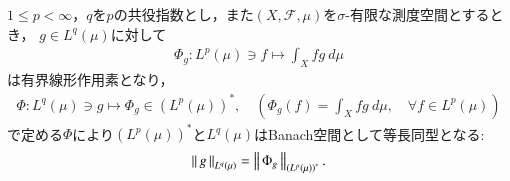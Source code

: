 	\begin{screen}
		\begin{thm}[$L^p$の共役空間]\label{thm:dual_space_of_L_p}
			$1 \leq p < \infty$，$q$を$p$の共役指数とし，また$(X,\mathscr{F},\mu)$を$\sigma$-有限な測度空間とするとき，
			$g \in L^q(\mu)$に対して
			\begin{align}
				\Phi_g: L^p(\mu) \ni f \longmapsto \int_X fg\ d\mu
				\label{eq:thm_dual_space_of_L_p_1}
			\end{align}
			は有界線形作用素となり，
			\begin{align}
				\Phi: L^q(\mu) \ni g \longmapsto \Phi_g \in \left( L^p(\mu) \right)^*,
				\quad \left( \Phi_g(f) = \int_X fg\ d\mu,\quad \forall f \in L^p(\mu) \right)
			\end{align}
			で定める$\Phi$により$\left( L^p(\mu) \right)^*$と$L^q(\mu)$はBanach空間として等長同型となる:
			\begin{align}
				\left\|\, g\, \right\|_{L^q(\mu)} = \left\|\, \Phi_g\, \right\|_{\left( L^p(\mu) \right)^*}.
			\end{align}
		\end{thm}
	\end{screen}
	
